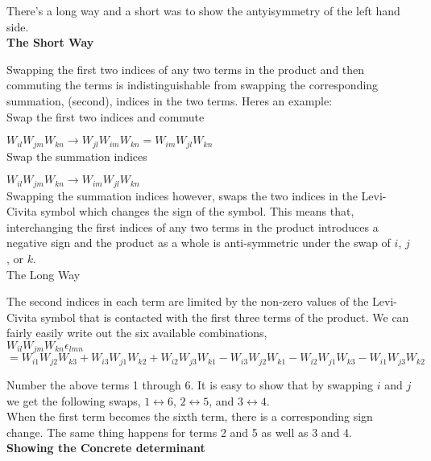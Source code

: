 \documentclass[prb,preprint]
{revtex4-1}
\begin{document}
There's a long way and a short was to show the antyisymmetry of the left hand side.\\


\textbf{The Short Way}

Swapping the first two indices of any two terms in the product and then commuting the terms is indistinguishable from swapping the corresponding summation, (second), indices in the two terms.  Heres an example:\\

Swap the first two indices and commute

$W_{il}W_{jm}W_{kn} \rightarrow W_{jl}W_{im}W_{kn} = W_{im}W_{jl}W_{kn}$
\\

Swap the summation indices

$W_{il}W_{jm}W_{kn} \rightarrow W_{im}W_{jl}W_{kn}$
\\

Swapping the summation indices however, swaps the two indices in the Levi-Civita symbol which changes the sign of the symbol.  This means that, interchanging the first indices of any two terms in the product introduces a negative sign and the product as a whole is anti-symmetric under the swap of $i$, $j$, or $k$.
\\

The Long Way

The second indices in each term are limited by the non-zero values of the Levi-Civita symbol that is contacted with the first three terms of the product.  We can fairly easily write out the six available combinations,\\
$W_{il}W_{jm}W_{kn}\epsilon_{lmn}$\\
$= W_{i1}W_{j2}W_{k3} + W_{i3}W_{j1}W_{k2} + W_{i2}W_{j3}W_{k1} - W_{i3}W_{j2}W_{k1} - W_{i2}W_{j1}W_{k3} - W_{i1}W_{j3}W_{k2}$

Number the above terms 1 through 6.  It is easy to show that by swapping $i$ and $j$ we get the following swaps, $1\leftrightarrow 6$,  $2\leftrightarrow 5$, and $3\leftrightarrow 4$.  \\

When the first term becomes the sixth term, there is a corresponding sign change.  The same thing happens for terms 2 and 5 as well as 3 and 4.
\\

{\bf Showing the Concrete determinant}\\
\end{document}
